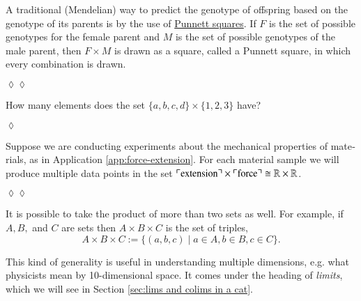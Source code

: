 \documentclass{book}
\def\tn{\textnormal}
\def\RR{{\mathbb R}}
\def\iso{\cong}
\def\|{{\;|\;}}
\newcommand{\fakebox}[1]{\tn{$\ulcorner$#1$\urcorner$}}
\theoremstyle{theoremENG}
\theoremstyle{lemmaENG}
\theoremstyle{propositionENG}
\theoremstyle{corollaryENG}
\theoremstyle{factENG}
\theoremstyle{remarkENG}
\newtheorem{remarkENG}[subsubsection]{\begin{english}Remark\end{english}}
\theoremstyle{exampleENG}
\theoremstyle{warningENG}
\theoremstyle{questionENG}
\theoremstyle{guessENG}
\theoremstyle{answerENG}
\theoremstyle{constructionENG}
\theoremstyle{rulesENG}
\theoremstyle{excENG}
\newtheorem{excENG}[subsubsection]{\begin{english}Exercise\end{english}}
\theoremstyle{appENG}
\newtheorem{appENG}[subsubsection]{\begin{english}Application\end{english}}
\theoremstyle{definitionENG}
\theoremstyle{notationENG}
\theoremstyle{conjectureENG}
\theoremstyle{postulateENG}
\newenvironment{exerciseENG}{\begin{excENG}}{\hspace*{\fill}$\lozenge$\end{excENG}}
\newenvironment{applicationENG}{\begin{appENG}}{\hspace*{\fill}$\lozenge\lozenge$\end{appENG}}
\theoremstyle{theoremRUS}
\theoremstyle{lemmaRUS}
\theoremstyle{propositionRUS}
\theoremstyle{corollaryRUS}
\theoremstyle{factRUS}
\theoremstyle{remarkRUS}
\theoremstyle{exampleRUS}
\theoremstyle{warningRUS}
\theoremstyle{questionRUS}
\theoremstyle{guessRUS}
\theoremstyle{answerRUS}
\theoremstyle{constructionRUS}
\theoremstyle{rulesRUS}
\theoremstyle{excRUS}
\theoremstyle{appRUS}
\theoremstyle{definitionRUS}
\theoremstyle{notationRUS}
\theoremstyle{conjectureRUS}
\theoremstyle{postulateRUS}
\begin{document}
\begin{english}
\begin{applicationENG}
A traditional (Mendelian) way to predict the genotype of offspring based on the genotype of its parents is by the use of \href{http://en.wikipedia.org/wiki/Punnett_square}{Punnett squares}. If $F$ is the set of possible genotypes for the female parent and $M$ is the set of possible genotypes of the male parent, then $F\times M$ is drawn as a square, called a Punnett square, in which every combination is drawn. 

\begin{russian} \end{russian}

\end{applicationENG}

\begin{exerciseENG}

How many elements does the set $\{a,b,c,d\}\times\{1,2,3\}$ have?

\begin{russian} \end{russian}

\end{exerciseENG}

\begin{applicationENG}

Suppose we are conducting experiments about the mechanical properties of materials, as in Application \ref{app:force-extension}. For each material sample we will produce multiple data points in the set $\fakebox{extension}\times\fakebox{force}\iso\RR\times\RR$.

\begin{russian} \end{russian}

\end{applicationENG}

\begin{remarkENG}

It is possible to take the product of more than two sets as well. For example, if $A,B,$ and $C$ are sets then $A\times B\times C$ is the set of triples, 
$$A\times B\times C:=\{(a,b,c)\|a\in A, b\in B, c\in C\}.$$

\begin{russian} \end{russian}

This kind of generality is useful in understanding multiple dimensions, e.g. what physicists mean by 10-dimensional space. It comes under the heading of {\em limits}, which we will see in Section \ref{sec:lims and colims in a cat}.


\end{remarkENG}
\end{english}
\end{document}
